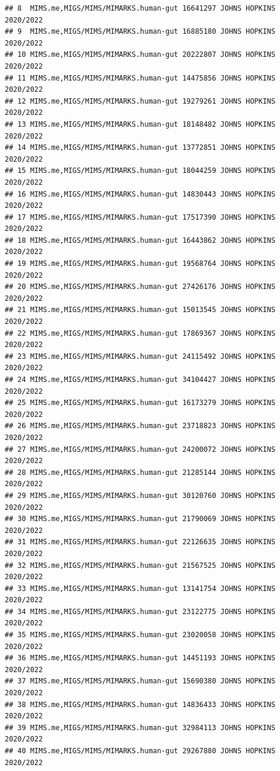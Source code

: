\documentclass[
]{article}
\begin{document}
\begin{verbatim}
## 8  MIMS.me,MIGS/MIMS/MIMARKS.human-gut 16641297 JOHNS HOPKINS       2020/2022
## 9  MIMS.me,MIGS/MIMS/MIMARKS.human-gut 16885180 JOHNS HOPKINS       2020/2022
## 10 MIMS.me,MIGS/MIMS/MIMARKS.human-gut 20222807 JOHNS HOPKINS       2020/2022
## 11 MIMS.me,MIGS/MIMS/MIMARKS.human-gut 14475856 JOHNS HOPKINS       2020/2022
## 12 MIMS.me,MIGS/MIMS/MIMARKS.human-gut 19279261 JOHNS HOPKINS       2020/2022
## 13 MIMS.me,MIGS/MIMS/MIMARKS.human-gut 18148482 JOHNS HOPKINS       2020/2022
## 14 MIMS.me,MIGS/MIMS/MIMARKS.human-gut 13772851 JOHNS HOPKINS       2020/2022
## 15 MIMS.me,MIGS/MIMS/MIMARKS.human-gut 18044259 JOHNS HOPKINS       2020/2022
## 16 MIMS.me,MIGS/MIMS/MIMARKS.human-gut 14830443 JOHNS HOPKINS       2020/2022
## 17 MIMS.me,MIGS/MIMS/MIMARKS.human-gut 17517390 JOHNS HOPKINS       2020/2022
## 18 MIMS.me,MIGS/MIMS/MIMARKS.human-gut 16443862 JOHNS HOPKINS       2020/2022
## 19 MIMS.me,MIGS/MIMS/MIMARKS.human-gut 19568764 JOHNS HOPKINS       2020/2022
## 20 MIMS.me,MIGS/MIMS/MIMARKS.human-gut 27426176 JOHNS HOPKINS       2020/2022
## 21 MIMS.me,MIGS/MIMS/MIMARKS.human-gut 15013545 JOHNS HOPKINS       2020/2022
## 22 MIMS.me,MIGS/MIMS/MIMARKS.human-gut 17869367 JOHNS HOPKINS       2020/2022
## 23 MIMS.me,MIGS/MIMS/MIMARKS.human-gut 24115492 JOHNS HOPKINS       2020/2022
## 24 MIMS.me,MIGS/MIMS/MIMARKS.human-gut 34104427 JOHNS HOPKINS       2020/2022
## 25 MIMS.me,MIGS/MIMS/MIMARKS.human-gut 16173279 JOHNS HOPKINS       2020/2022
## 26 MIMS.me,MIGS/MIMS/MIMARKS.human-gut 23718823 JOHNS HOPKINS       2020/2022
## 27 MIMS.me,MIGS/MIMS/MIMARKS.human-gut 24200072 JOHNS HOPKINS       2020/2022
## 28 MIMS.me,MIGS/MIMS/MIMARKS.human-gut 21285144 JOHNS HOPKINS       2020/2022
## 29 MIMS.me,MIGS/MIMS/MIMARKS.human-gut 30120760 JOHNS HOPKINS       2020/2022
## 30 MIMS.me,MIGS/MIMS/MIMARKS.human-gut 21790069 JOHNS HOPKINS       2020/2022
## 31 MIMS.me,MIGS/MIMS/MIMARKS.human-gut 22126635 JOHNS HOPKINS       2020/2022
## 32 MIMS.me,MIGS/MIMS/MIMARKS.human-gut 21567525 JOHNS HOPKINS       2020/2022
## 33 MIMS.me,MIGS/MIMS/MIMARKS.human-gut 13141754 JOHNS HOPKINS       2020/2022
## 34 MIMS.me,MIGS/MIMS/MIMARKS.human-gut 23122775 JOHNS HOPKINS       2020/2022
## 35 MIMS.me,MIGS/MIMS/MIMARKS.human-gut 23020058 JOHNS HOPKINS       2020/2022
## 36 MIMS.me,MIGS/MIMS/MIMARKS.human-gut 14451193 JOHNS HOPKINS       2020/2022
## 37 MIMS.me,MIGS/MIMS/MIMARKS.human-gut 15690380 JOHNS HOPKINS       2020/2022
## 38 MIMS.me,MIGS/MIMS/MIMARKS.human-gut 14836433 JOHNS HOPKINS       2020/2022
## 39 MIMS.me,MIGS/MIMS/MIMARKS.human-gut 32984113 JOHNS HOPKINS       2020/2022
## 40 MIMS.me,MIGS/MIMS/MIMARKS.human-gut 29267880 JOHNS HOPKINS       2020/2022

\end{verbatim}
\end{document}
